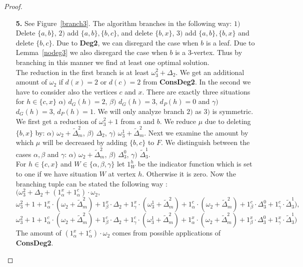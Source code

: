 \documentclass{llncs}
\newcommand{\scl}{0.67}
\begin{document}
{\begin{proof}
\begin{enumerate}
\item[\bf 5.] See Figure~\ref{branch3}. The algorithm branches in the following way: $1)$ Delete $\{a,b\}$, $2)$ add $\{a,b\},\{b,c\}$, and delete $\{b,x\}$, $3)$ add $\{a,b\},\{b,x\}$ and delete $\{b,c\}$. Due to {\bf Deg2}, 
we can disregard the case when $b$ is a leaf. Due to Lemma~\ref{nodeg3} we also disregard the case when $b$ is a 3-vertex. Thus by branching in this manner we find at least one optimal solution.\\[0.5ex]
The reduction in the first branch is at least $\omega_3^2+\Delta_2$. We get an additional amount of $\omega_2$ if $d(x)=2$ or $d(c)=2$ from {\bf ConsDeg2}. In the second we have to consider also the vertices $c$ and $x$. There are exactly three situations for $h \in \{c,x\}$ $\alpha)$ $d_G(h)=2$, $\beta)$ $d_G(h)=3$, $d_P(h)=0$ and $\gamma)$ $d_G(h)=3$, $d_P(h)=1$. We will only analyze branch $2)$ as $3)$ is symmetric.  We first get a reduction of $\omega_3^2+1$ from $a$ and $b$.
We reduce $\mu$ due to deleting $\{b,x\}$ by: $\alpha)$ $\omega_2+\tilde \Delta_m^2$, $\beta)$ $\Delta_2$, $\gamma)$ $\omega_3^1+\tilde \Delta_m^2$. Next we examine the amount by which $\mu$ will be decreased by adding $\{b,c\}$ to $F$. We distinguish between the cases $\alpha,\beta$ and $\gamma$: $\alpha)$ $\omega_2+\tilde \Delta_m^2$, $\beta)$ $\Delta_3^0$, $\gamma)$ $\tilde \Delta_3^1$.\\
For $h \in\{c,x\}$ and $W \in \{\alpha,\beta,\gamma\}$ let $1_W^h$ be the indicator function which is set to one if we have situation $W$ at vertex $h$. Otherwise it is zero. Now the branching tuple can be stated the following way :\\
$(\omega_3^2+\Delta_2+(1_{\alpha}^x+1_\alpha^c)\cdot \omega_2,$
$\omega_3^2+1+1^x_\alpha \cdot (\omega_2+\tilde \Delta_m^2)+1^x_\beta \cdot \Delta_2 +1^x_\gamma \cdot(\omega_3^1+\tilde \Delta_m^2)+1^c_\alpha\cdot (\omega_2+ \tilde \Delta_m^2)+ 1^c_\beta \cdot \Delta_3^0+1^c_\gamma \cdot \tilde \Delta_3^1),$\\
$ \omega_3^2+1+1^c_\alpha \cdot (\omega_2+\tilde \Delta_m^2)+1^c_\beta \cdot \Delta_2 +1^c_\gamma \cdot(\omega_3^1+\tilde \Delta_m^2)+1^x_\alpha\cdot (\omega_2+\tilde \Delta_m^2) + 1^x_\beta \cdot \Delta_3^0+1^x_\gamma \cdot \tilde\Delta_3^1)$\\
The amount of $(1_{\alpha}^x+1_\alpha^c)\cdot \omega_2$ comes from possible applications of {\bf ConsDeg2}.
\end{enumerate}




\begin{figure}\centering
{}
\hspace*{0.75ex}
\hspace*{0.75ex}
\hspace*{0.75ex}
\caption{}
\label{branch}
\end{figure}


\end{proof}}
\end{document}
